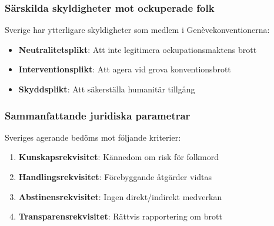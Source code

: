 \subsubsection{Särskilda skyldigheter mot ockuperade folk}
Sverige har ytterligare skyldigheter som medlem i Genèvekonventionerna:
\begin{itemize}
\item \textbf{Neutralitetsplikt}: Att inte legitimera ockupationsmaktens brott
\item \textbf{Interventionsplikt}: Att agera vid grova konventionsbrott
\item \textbf{Skyddsplikt}: Att säkerställa humanitär tillgång
\end{itemize}

\subsubsection{Sammanfattande juridiska parametrar}
Sveriges agerande bedöms mot följande kriterier:
\begin{enumerate}
\item \textbf{Kunskapsrekvisitet}: Kännedom om risk för folkmord
\item \textbf{Handlingsrekvisitet}: Förebyggande åtgärder vidtas
\item \textbf{Abstinensrekvisitet}: Ingen direkt/indirekt medverkan
\item \textbf{Transparensrekvisitet}: Rättvis rapportering om brott
\end{enumerate}